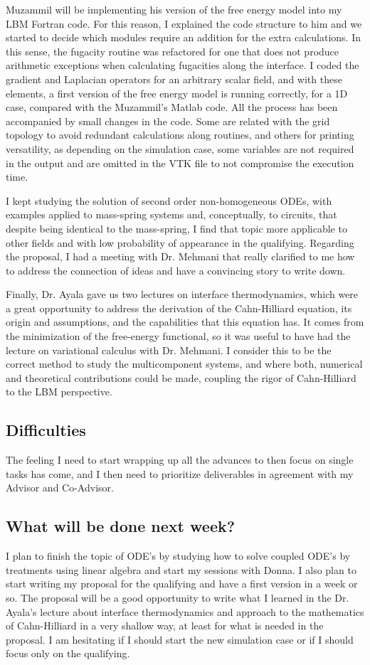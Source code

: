 \documentclass[12pt]{article}
\begin{document}
	Muzammil will be implementing his version of the free energy model into my LBM Fortran code. For this reason, I explained the code structure to him and we started to decide which modules require an addition for the extra calculations. In this sense, the fugacity routine was refactored for one that does not produce arithmetic exceptions when calculating fugacities along the interface. I coded the gradient and Laplacian operators for an arbitrary scalar field, and with these elements, a first version of the free energy model is running correctly, for a 1D case, compared with the Muzammil's Matlab code. All the process has been accompanied by small changes in the code. Some are related with the grid topology to avoid redundant calculations along routines, and others for printing versatility, as depending on the simulation case, some variables are not required in the output and are omitted in the VTK file to not compromise the execution time.
	
	I kept studying the solution of second order non-homogeneous ODEs, with examples applied to mass-spring systems and, conceptually, to circuits, that despite being identical to the mass-spring, I find that topic more applicable to other fields and with low probability of appearance in the qualifying. Regarding the proposal, I had a meeting with Dr. Mehmani that really clarified to me how to address the connection of ideas and have a convincing story to write down. 
	
	Finally, Dr. Ayala gave us two lectures on interface thermodynamics, which were a great opportunity to address the derivation of the Cahn-Hilliard equation, its origin and assumptions, and the capabilities that this equation has. It comes from the minimization of the free-energy functional, so it was useful to have had the lecture on variational calculus with Dr. Mehmani. I consider this to be the correct method to study the multicomponent systems, and where both, numerical and theoretical contributions could be made, coupling the rigor of Cahn-Hilliard to the LBM perspective. 
	  
	\subsection*{Difficulties}
	 The feeling I need to start wrapping up all the advances to then focus on single tasks has come, and I then need to prioritize deliverables in agreement with my Advisor and Co-Advisor.
	
	\subsection*{What will be done next week?}
	I plan to finish the topic of ODE's by studying how to solve coupled ODE's by treatments using linear algebra and start my sessions with Donna. I also plan to start writing my proposal for the qualifying and have a first version in a week or so. The proposal will be a good opportunity to write what I learned in the Dr. Ayala's lecture about interface thermodynamics and approach to the mathematics of Cahn-Hilliard in a very shallow way, at least for what is needed in the proposal. I am hesitating if I should start the new simulation case or if I should focus only on the qualifying. 
	
\end{document}
